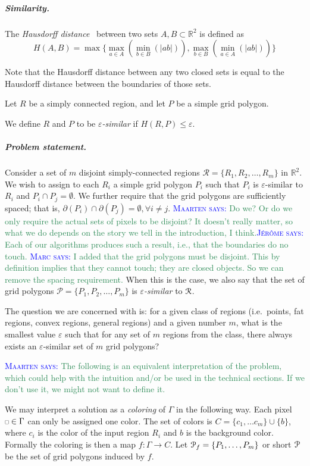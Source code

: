 \documentclass[a4paper,UKenglish,cleveref]{lipics-v2019}
\newcommand{\mremark}[3]{\textcolor{blue}{\textsc{#1 #2:}} \textcolor{SeaGreen}{\textsf{#3}}}
\newcommand{\maarten}[2][says]{\mremark{Maarten}{#1}{#2}}
\newcommand{\marc}[2][says]{\mremark{Marc}{#1}{#2}}
\newcommand{\jerome}[2][says]{\mremark{J\'er\^ome}{#1}{#2}}
\newcommand{\pix}{\scalebox{0.6}{$\square$}}
\newcommand{\eps}{\varepsilon}
\newcommand{\R}{\mathbb{R}}
\begin{document}
\subparagraph {Similarity.}

The {\em Hausdorff distance}~\cite{} between two sets $A, B \subset \R^2$ is defined as
\[
  H(A, B) = \max \{\max_{a \in A}(\min_{b \in B}(|ab|)), \max_{b \in B}(\min_{a \in A}(|ab|))\}
\]

Note that the Hausdorff distance between any two closed sets is equal to the Hausdorff distance between the boundaries of those sets.

Let $R$ be a simply connected region, and let $P$ be a simple grid polygon.

\begin{definition}
We define $R$ and $P$ to be {\em $\eps$-similar} if $H(R,P) \le \eps$.
\end{definition}


\subparagraph {Problem statement.}

Consider a set of $m$ disjoint simply-connected regions $\mathcal{R} = \{R_1, R_2, \ldots, R_m\}$ in $\mathbb{R}^2$.
We wish to assign to each $R_i$ a simple grid polygon $P_i$ such that $P_i$ is $\eps$-similar to $R_i$ and $P_i\cap P_j=\emptyset$.
We further require that the grid polygons are sufficiently spaced; that is, $\partial(P_i) \cap \partial(P_j) = \emptyset, \forall i \ne j$. \maarten {Do we? Or do we only require the actual sets of pixels to be disjoint? It doesn't really matter, so what we do depends on the story we tell in the introduction, I think.}\jerome{Each of our algorithms produces such a result, i.e., that the boundaries do no touch.}
\marc{I added that the grid polygons must be disjoint. This by definition implies that they cannot touch; they are closed objects. So we can remove the spacing requirement.}
When this is the case, we also say that the set of grid polygons $\mathcal{P} = \{P_1, P_2, \ldots, P_m\}$ is {\em $\eps$-similar} to $\cal R$.

The question we are concerned with is: for a given class of regions (i.e.\ points, fat regions, convex regions, general regions) and a given number $m$, what is the smallest value $\eps$ such that for any set of $m$ regions from the class, there always exists an $\eps$-similar set of $m$ grid polygons?

\maarten {The following is an equivalent interpretation of the problem, which could help with the intuition and/or be used in the technical sections. If we don't use it, we might not want to define it.}

We may interpret a solution as a {\em coloring} of $\Gamma$ in the following way.
Each pixel $\pix\in\Gamma$ can only be assigned one color. The set of colors is $C = \{c_1,\dots c_m\}\cup\{b\}$, where $c_i$ is the color of the input region $R_i$ and $b$ is the background color.
Formally the coloring is then a map $f:\Gamma\to C$.
Let ${\cal P}_f=\{P_1,\dots, P_m\}$ or short ${\cal P}$ be the set of grid polygons induced by $f$.
\end{document}
